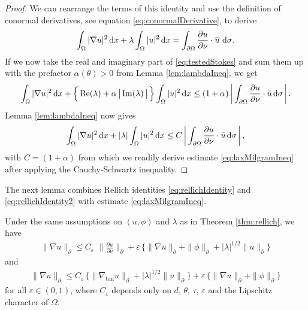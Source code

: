 \begin{proof}
  We can rearrange the terms of this identity and use the definition of conormal derivatives, see equation \eqref{eq:conormalDerivative}, to derive
  \begin{align}
    \label{eq:testedStokes}
    \int_\Omega |\nabla u|^2 \, {\operatorname{d}\!{x}} + \lambda \int_\Omega |u|^2 \, {\operatorname{d}\!{x}} = \int_{\partial\Omega} \frac{\partial u}{\partial \nu} \cdot \overline u \, \, {\operatorname{d}\!{\sigma}}.
  \end{align}
  If we now take the real and imaginary part of \eqref{eq:testedStokes} and sum them up with the prefactor $\alpha(\theta) > 0$ from Lemma \ref{lem:lambdaIneq}, we get
  \begin{align*}
    \int_\Omega |\nabla u|^2 \, {\operatorname{d}\!{x}} + \Big\{ \operatorname{Re}(\lambda) + \alpha\, \big|\operatorname{Im}(\lambda)\,\big|\, \Big\} \int_\Omega |u|^2 \, {\operatorname{d}\!{x}}
    \leq (1 + \alpha) \, \bigg| \int_{\partial\Omega} \frac{\partial u}{\partial \nu} \cdot \bar u \, {\operatorname{d}\!{\sigma}} \, \bigg|\,.
  \end{align*}
  Lemma \ref{lem:lambdaIneq} now gives
  \begin{align*}
    \int_\Omega |\nabla u|^2 \, {\operatorname{d}\!{x}} + |\lambda| \int_\Omega |u|^2 \, {\operatorname{d}\!{x}} \leq C\,  \bigg| \int_{\partial\Omega} \frac{\partial u}{\partial \nu} \cdot \bar u \, {\operatorname{d}\!{\sigma}}\, \bigg|\,,
  \end{align*}
  with $C = (1 + \alpha)$ from which we readily derive estimate \eqref{eq:laxMilgramIneq} after applying the Cauchy-Schwartz inequality.
\end{proof}

The next lemma combines Rellich identities \eqref{eq:rellichIdentity} and \eqref{eq:rellichIdentity2} with estimate \eqref{eq:laxMilgramIneq}.

\begin{lem}
  Under the same assumptions on $(u,\phi)$ and $\lambda$ as in Theorem \ref{thm:rellich}, we have
  \begin{align}
    \label{eq:gradEstimateRellich}
    \| \nabla u\|_\partial \leq C_\varepsilon\, \,\Big\| \frac{\partial u}{\partial \nu} \Big\|_\partial + \varepsilon \,\Big\{ \|\nabla u\|_\partial + \|\phi\|_\partial +  |\lambda|^{1/2} \| u\|_\partial \Big\}
  \end{align}
  and
  \begin{align}
    \label{eq:gradEstimateRellich2}
    \|\nabla u\|_\partial \leq C_\varepsilon\, \Big\{ \|\nabla_{\mathrm{tan}} u \|_\partial + |\lambda|^{1/2} \| u\|_\partial \Big\} + \varepsilon\, \Big\{ \|\nabla u\|_\partial + \|\phi\|_\partial \Big\}
  \end{align}
  for all $\varepsilon \in (0,1)$, where $C_\varepsilon$ depends only on $d$, $\theta$, $\tau$, $\varepsilon$ and the Lipschitz character of $\Omega$.
\end{lem}

